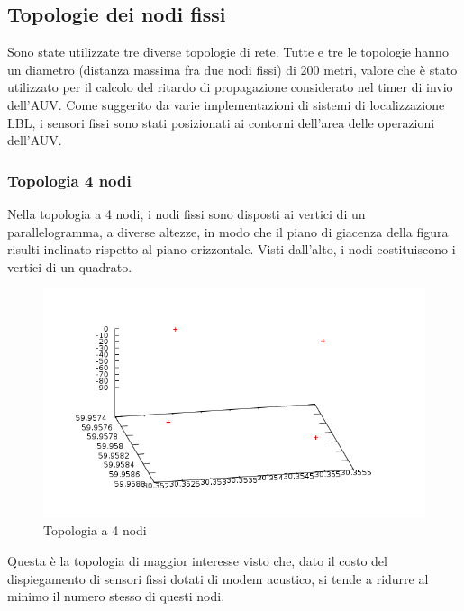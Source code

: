 \documentclass[Lau,binding=0.6cm]{sapthesis}
\begin{document}
\subsection{Topologie dei nodi fissi}
Sono state utilizzate tre diverse topologie di rete. Tutte e tre le topologie hanno un diametro (distanza massima fra due nodi fissi) di 200 metri, valore che è stato utilizzato per il calcolo del ritardo di propagazione considerato nel timer di invio dell'AUV. Come suggerito da varie implementazioni di sistemi di localizzazione LBL, i sensori fissi sono stati posizionati ai contorni dell'area delle operazioni dell'AUV. \newline
\subsubsection{Topologia 4 nodi}
Nella topologia a 4 nodi, i nodi fissi sono disposti ai vertici di un parallelogramma, a diverse altezze, in modo che il piano di giacenza della figura risulti inclinato rispetto al piano orizzontale. Visti dall'alto, i nodi costituiscono i vertici di un quadrato.
\begin{figure}[H]
    \centering
    \includegraphics[width=\linewidth]{squaretopology.png}
    \caption{Topologia a 4 nodi}
    \label{fig:my_label}
\end{figure}
Questa è la topologia di maggior interesse visto che, dato il costo del dispiegamento di sensori fissi dotati di modem acustico, si tende a ridurre al minimo il numero stesso di questi nodi.
\end{document}
